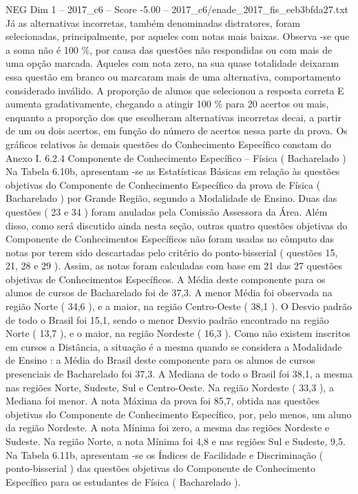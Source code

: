 \begin{textsample}{NEG Dim 1 – 2017\_c6 – Score -5.00 – 2017\_c6/enade\_2017\_fis\_eeb3bfda27.txt}
Já as alternativas incorretas, também denominadas distratores, foram selecionadas, principalmente, por aqueles com notas mais baixas.
Observa -se que a soma não é 100 \%, por causa das questões não respondidas ou com mais de uma opção marcada.
Aqueles com nota zero, na sua quase totalidade deixaram essa questão em branco ou marcaram mais de uma alternativa, comportamento considerado inválido.
A proporção de alunos que selecionou a resposta correta E aumenta gradativamente, chegando a atingir 100 \% para 20 acertos ou mais, enquanto a proporção dos que escolheram alternativas incorretas decai, a partir de um ou dois acertos, em função do número de acertos nessa parte da prova.
Os gráficos relativos às demais questões do Conhecimento Específico constam do Anexo I. 6.2.4 Componente de Conhecimento Específico – Física ( Bacharelado ) Na Tabela 6.10b, apresentam -se as Estatísticas Básicas em relação às questões objetivas do Componente de Conhecimento Específico da prova de Física ( Bacharelado ) por Grande Região, segundo a Modalidade de Ensino.
Duas das questões ( 23 e 34 ) foram anuladas pela Comissão Assessora da Área.
Além disso, como será discutido ainda nesta seção, outras quatro questões objetivas do Componente de Conhecimentos Específicos não foram usadas no cômputo das notas por terem sido descartadas pelo critério do ponto-bisserial ( questões 15, 21, 28 e 29 ).
Assim, as notas foram calculadas com base em 21 das 27 questões objetivas de Conhecimentos Específicos.
A Média deste componente para os alunos de cursos de Bacharelado foi de 37,3.
A menor Média foi observada na região Norte ( 34,6 ), e a maior, na região Centro-Oeste ( 38,1 ).
O Desvio padrão de todo o Brasil foi 15,1, sendo o menor Desvio padrão encontrado na região Norte ( 13,7 ), e o maior, na região Nordeste ( 16,3 ).
Como não existem inscritos em cursos a Distância, a situação é a mesma quando se considera a Modalidade de Ensino : a Média do Brasil deste componente para os alunos de cursos presenciais de Bacharelado foi 37,3.
A Mediana de todo o Brasil foi 38,1, a mesma nas regiões Norte, Sudeste, Sul e Centro-Oeste.
Na região Nordeste ( 33,3 ), a Mediana foi menor.
A nota Máxima da prova foi 85,7, obtida nas questões objetivas do Componente de Conhecimento Específico, por, pelo menos, um aluno da região Nordeste.
A nota Mínima foi zero, a mesma das regiões Nordeste e Sudeste.
Na região Norte, a nota Mínima foi 4,8 e nas regiões Sul e Sudeste, 9,5.
Na Tabela 6.11b, apresentam -se os Índices de Facilidade e Discriminação ( ponto-bisserial ) das questões objetivas do Componente de Conhecimento Específico para os estudantes de Física ( Bacharelado ).

\end{textsample}
